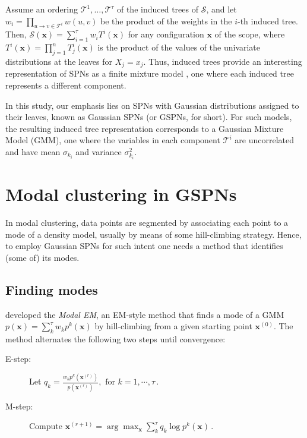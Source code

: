 \documentclass[accepted]{tpm2023} %
\begin{document}
Assume an ordering $\mathcal{T}^1,\dotsc,\mathcal{T}^{\tau}$ of the induced trees of $\mathcal{S}$, and let $w_i = \prod_{u \rightarrow v \in \mathcal{T}^i} w(u,v)$ be the product of the weights in the $i$-th induced tree.
Then, $\mathcal{S}(\mathbf{x}) = \sum_{i=1}^{\tau} w_i T^i(\mathbf{x})$ for any configuration $\mathbf{x}$ of the scope, where $T^i(\mathbf{x}) = \prod_{j=1}^n T_j^i(\mathbf{x})$ is the product of the values of the univariate distributions at the leaves for $X_j = x_j$.
Thus, induced trees provide an interesting representation of SPNs as a finite mixture model \citep{Zhao2016}, one where each induced tree represents a different component.

In this study, our emphasis lies on SPNs with Gaussian distributions assigned to their leaves, known as Gaussian SPNs (or GSPNs, for short).
For such models, the resulting induced tree representation corresponds to a Gaussian Mixture Model (GMM), one where the variables in each component $\mathcal{T}^i$ are uncorrelated and have mean $\sigma_{k_i}$ and variance $\sigma_{k_i}^2$.

\section{Modal clustering in GSPNs}
\label{sec:mem}

In modal clustering, data points are segmented by associating each point to a mode of a density model, usually by means of some hill-climbing strategy.
Hence, to employ Gaussian SPNs for such intent one needs a method that identifies (some of) its modes.

\subsection{Finding modes}

\citet{Li2007} developed the \emph{Modal EM}, an EM-style method that finds a mode of a GMM $p(\mathbf{x}) = \sum_k^\tau w_k p^k(\mathbf{x})$ by hill-climbing from a given starting point $\mathbf{x}^{(0)}$.
The method alternates the following two steps until convergence:

\begin{description}
  \item[E-step:] Let
    $q_k = \frac{w_k p^k\left(\mathbf{x}^{(r)}\right)}{p\left(\mathbf{x}^{(r)}\right)},
      \text{ for } k = 1, \cdots, \tau \, .$

  \item[M-step:] Compute
    $\mathbf{x}^{(r+1)} = \arg\max_\mathbf{x} \sum_k^\tau q_k \log p^k\left(\mathbf{x}\right) \, .$
\end{description}
\end{document}
